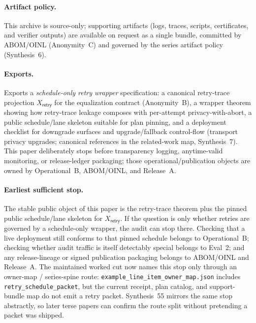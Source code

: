 \documentclass[11pt]{article}
\begin{document}
\paragraph{Artifact policy.} This archive is source-only; supporting artifacts (logs, traces, scripts, certificates, and verifier outputs) are available on request as a single bundle, committed by ABOM/OINL (Anonymity~C) and governed by the series artifact policy (Synthesis~6).\cite{series:artifactpolicy}

\paragraph{Exports.}
Exports a \emph{schedule-only retry wrapper} specification: a canonical retry-trace projection $X_{\mathsf{retry}}$ for the equalization contract (Anonymity~B),\cite{series:profiling}
a wrapper theorem showing how retry-trace leakage composes with per-attempt privacy-with-abort,
a public schedule/lane skeleton suitable for plan pinning,\cite{series:contractobjects}
and a deployment checklist for downgrade surfaces and upgrade/fallback control-flow (transport privacy upgrades; canonical references in the related-work map, Synthesis~7).\cite{series:relatedworkmap}
This paper deliberately stops before transparency logging, anytime-valid monitoring, or release-ledger packaging; those operational/publication objects are owned by Operational~B, ABOM/OINL, and Release~A.\cite{series:proofcarryingbudgets,series:advantagecontracts,series:releaseproperty}


\paragraph{Earliest sufficient stop.}
The stable public object of this paper is the retry-trace theorem plus the pinned public schedule/lane skeleton for $X_{\mathsf{retry}}$.
If the question is only whether retries are governed by a schedule-only wrapper, the audit can stop there.
Checking that a live deployment still conforms to that pinned schedule belongs to Operational~B; checking whether audit traffic is itself detectably special belongs to Eval~2; and any release-lineage or signed publication packaging belongs to ABOM/OINL and Release~A. The maintained worked cut now names this stop only through an owner-map / series-spine route: \nolinkurl{example\_line\_item\_owner\_map.json} includes \nolinkurl{retry\_schedule\_packet}, but the current receipt, plan catalog, and support-bundle map do not emit a retry packet. Synthesis~55 mirrors the same stop abstractly, so later terse papers can confirm the route split without pretending a packet was shipped.\cite{series:operationalB,series:advantagecontracts,series:abomoinl,series:releaseproperty,series:workedexample,series:seriesspines}
\end{document}
